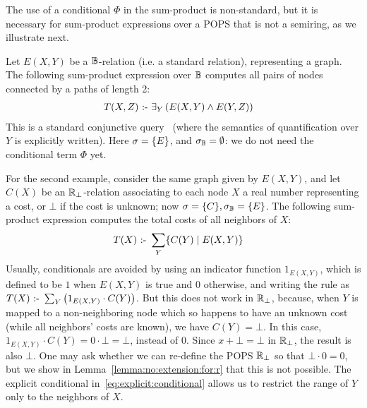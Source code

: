 The use of a conditional $\Phi$ in the sum-product is non-standard,
but it is necessary for sum-product expressions over a POPS that is
not a semiring, as we illustrate next.

\begin{ex} \label{ex:conditional:sum:product}
  Let $E(X,Y)$ be a $\mathbb B$-relation (i.e. a standard relation),
  representing a graph.  The following sum-product expression over $\mathbb B$ computes
  all pairs of nodes connected by a paths of length 2:
  \begin{align*}
      T(X,Z) & \text{ :- } \exists_Y \left(E(X,Y) \wedge E(Y,Z)\right)
  \end{align*}
  This is a standard conjunctive
  query~\cite{DBLP:books/aw/AbiteboulHV95} (where the semantics of
  quantification over $Y$ is explicitly written).  Here
  $\sigma = \{E\}$, and $\sigma_\mathbb B = \emptyset$: we do not need the
  conditional term $\Phi$ yet.

  For the second example, consider the same graph given by $E(X,Y)$,
  and let $C(X)$ be an $\mathbb R_\bot$-relation associating to each node $X$
  a real number representing a cost, or $\bot$ if the cost is unknown;
  now $\sigma = \{C\}, \sigma_\mathbb B = \{E\}$.  The following
  sum-product expression computes the total costs of all neighbors of
  $X$:
  \begin{align}
    T(X) \text{ :- } & \sum_Y \{{C(Y)}\mid{E(X,Y)}\} \label{eq:explicit:conditional}
  \end{align}
  Usually, conditionals are avoided by using an indicator function
  $1_{E(X,Y)}$, which is defined to be $1$ when $E(X,Y)$ is true and
  $0$ otherwise, and writing the rule as
  $T(X) \text{ :- } \sum_Y \left(1_{E(X,Y)}\cdot C(Y)\right)$.  But this does
  not work in $\mathbb R_\bot$, because, when $Y$ is mapped to a
  non-neighboring node which so happens to have an unknown cost (while
  all neighbors' costs are known), we have $C(Y) = \bot$. In this
  case, $1_{E(X,Y)} \cdot C(Y) = 0 \cdot \bot = \bot$, instead of
  $0$. Since $x + \bot = \bot$ in $\mathbb R_\bot$, the result is also
  $\bot$.  One may ask whether we can re-define the POPS $\mathbb R_\bot$ so
  that $\bot \cdot 0 = 0$, but we show in
  Lemma~\ref{lemma:no:extension:for:r} that this is not possible.  The
  explicit conditional in~\eqref{eq:explicit:conditional} allows us to
  restrict the range of $Y$ only to the neighbors of $X$.
\end{ex}

